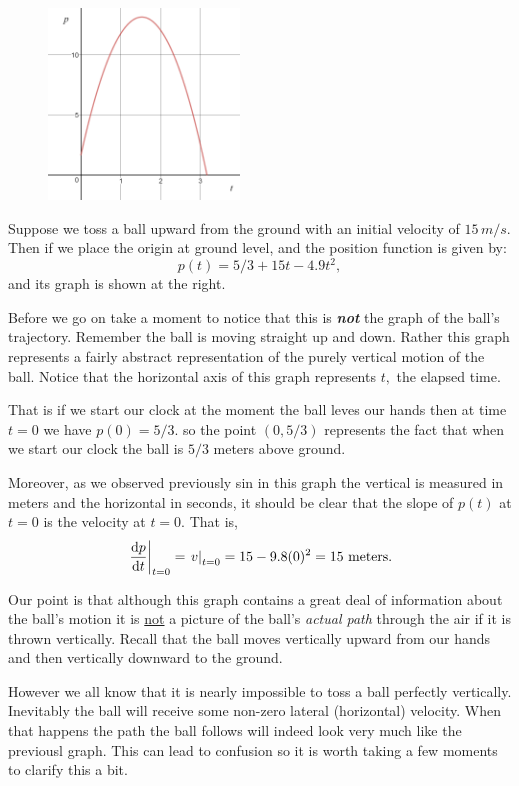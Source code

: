 \begin{figure}
\captionsetup{labelformat=empty}
\includegraphics*[height=2in,width=2in]{Figures/FallingBallGraph1}
\label{fig:FallingBallGraph1}
\end{figure}
Suppose we toss a ball upward from the ground with an initial velocity
of $15\,m/s.$ Then if we place the origin at ground level, and the
position  function is given by:
$$
p(t) = 5/3 + 15t-4.9t^2,
$$
and its graph is shown at the right.

Before we go on take a moment to notice that this is \emph{\bf{}not}
the graph of the ball's trajectory. Remember the ball is moving
straight up and down. Rather this graph  represents a fairly abstract
representation of the purely vertical motion of the ball. Notice that
the horizontal axis of this graph represents $t,$ the elapsed time.

That is if we start our clock at the moment the ball leves our hands
then at time $t=0$ we have $p(0)=5/3.$ so the point $(0,5/3)$
represents the fact that when we start our clock the ball is $5/3$
meters above ground.

Moreover, as we observed previously sin in this graph the vertical is
measured in meters and the horizontal in seconds, it should be clear
that the slope of $p(t)$ at $t=0$ is the velocity at $t=0.$ That is,
$$
\left.\frac{\text{d}{p}}{\text{d}{t}}\right|_{t=0} = \left.v\right|_{t=0} = 15-9.8(0)^2= 15
\text{ meters.}
$$

Our point is that although this graph contains a great deal of
information about the ball's motion it is \underline{not} a picture of
the ball's \emph{actual path} through the air if it is thrown
vertically. Recall that the ball moves vertically upward from our
hands and then vertically downward to the ground.

However we all know that it is nearly impossible to toss a ball
perfectly vertically. Inevitably the ball will receive some non-zero
lateral (horizontal) velocity. When that happens the path the ball
follows will indeed look very much like the previousl graph. This can
lead to  confusion so it is worth taking a few moments to clarify this
a bit. 

